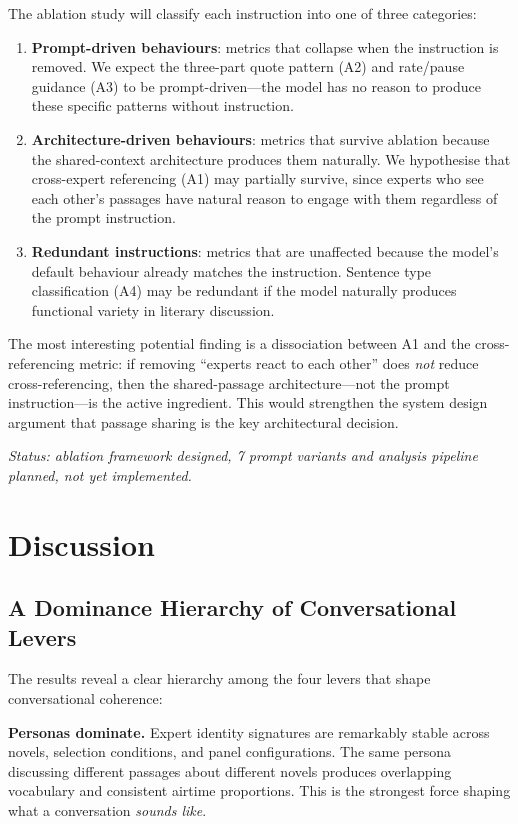 \documentclass[final]{clv2025}
\begin{document}
The ablation study will classify each instruction into one of three
categories:

\begin{enumerate}
\item \textbf{Prompt-driven behaviours}: metrics that collapse when
  the instruction is removed.  We expect the three-part quote pattern
  (A2) and rate/pause guidance (A3) to be prompt-driven---the model
  has no reason to produce these specific patterns without instruction.
\item \textbf{Architecture-driven behaviours}: metrics that survive
  ablation because the shared-context architecture produces them
  naturally.  We hypothesise that cross-expert referencing (A1) may
  partially survive, since experts who see each other's passages have
  natural reason to engage with them regardless of the prompt
  instruction.
\item \textbf{Redundant instructions}: metrics that are unaffected
  because the model's default behaviour already matches the
  instruction.  Sentence type classification (A4) may be redundant if
  the model naturally produces functional variety in literary
  discussion.
\end{enumerate}

The most interesting potential finding is a dissociation between A1
and the cross-referencing metric: if removing ``experts react to each
other'' does \emph{not} reduce cross-referencing, then the
shared-passage architecture---not the prompt instruction---is the
active ingredient.  This would strengthen the system design argument
that passage sharing is the key architectural decision.

\emph{Status: ablation framework designed, 7 prompt variants and
analysis pipeline planned, not yet implemented.}




\section{Discussion}
\label{sec:discussion}

\subsection{A Dominance Hierarchy of Conversational Levers}

The results reveal a clear hierarchy among the four levers that shape
conversational coherence:

\textbf{Personas dominate.}  Expert identity signatures are
remarkably stable across novels, selection conditions, and panel
configurations.  The same persona discussing different passages about
different novels produces overlapping vocabulary and consistent
airtime proportions.  This is the strongest force shaping what a
conversation \emph{sounds like}.
\end{document}
